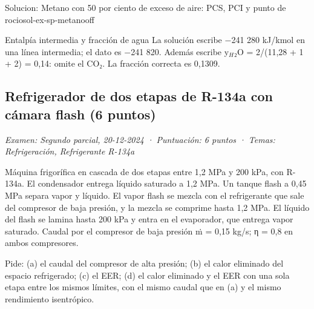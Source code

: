 \documentclass[11pt,a4paper]{article}
\begin{document}
\begin{ocg}{Solucion: Metano con 50  por ciento de exceso de aire: PCS, PCI y punto de rocio}{sol-ex-sp-metano}{off}
\begin{ojobox}{Entalpía intermedia y fracción de agua}
La solución escribe −241 280 kJ/kmol en una línea intermedia; el dato es −241 820. Además escribe y$_{H}$₂O = 2/(11,28 + 1 + 2) = 0,14: omite el CO₂. La fracción correcta es 0,1309.
\end{ojobox}

\hspace{0pt}\end{ocg}

\subsection{Refrigerador de dos etapas de R-134a con cámara flash (6 puntos)}
\noindent\textit{Examen: Segundo parcial, 20-12-2024 · Puntuación: 6 puntos · Temas: Refrigeración, Refrigerante R-134a}\par\medskip

Máquina frigorífica en cascada de dos etapas entre 1,2 MPa y 200 kPa, con R-134a. El condensador entrega líquido saturado a 1,2 MPa. Un tanque flash a 0,45 MPa separa vapor y líquido. El vapor flash se mezcla con el refrigerante que sale del compresor de baja presión, y la mezcla se comprime hasta 1,2 MPa. El líquido del flash se lamina hasta 200 kPa y entra en el evaporador, que entrega vapor saturado. Caudal por el compresor de baja presión ṁ = 0,15 kg/s; η = 0,8 en ambos compresores.

Pide: (a) el caudal del compresor de alta presión; (b) el calor eliminado del espacio refrigerado; (c) el EER; (d) el calor eliminado y el EER con una sola etapa entre los mismos límites, con el mismo caudal que en (a) y el mismo rendimiento isentrópico.
\end{document}
